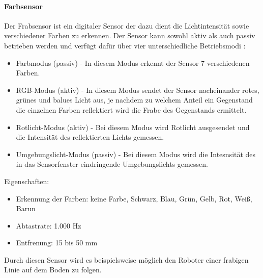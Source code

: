 \paragraph{Farbsensor}
\color{finishing}
Der Frabsensor ist ein digitaler Sensor der dazu dient die Lichtintensität sowie verschiedener Farben zu erkennen. Der Sensor kann sowohl
aktiv als auch passiv betrieben werden und verfügt dafür über vier unterschiedliche Betriebsmodi  \cite[vgl.][101]{Schobel.RobertaEV3Programmieren}:
\begin{itemize}
	\item{Farbmodus (passiv)} - In diesem Modus erkennt der Sensor 7 verschiedenen Farben.
	\item{RGB-Modus (aktiv)} - In diesem Modus sendet der Sensor nacheinander rotes, grünes und balues Licht aus, je nachdem zu welchem Anteil ein Gegenstand die einzelnen Farben reflektiert wird die Frabe des Gegenstands ermittelt.
	\item{Rotlicht-Modus (aktiv)} - Bei diesem Modus wird Rotlicht ausgesendet und die Intensität des reflektierten Lichts gemessen.
	\item{Umgebungslicht-Modus (passiv)} - Bei diesem Modus wird die Intesnsität des in das Sensorfenster eindringende Umgebungslichts gemessen.
\end{itemize}
\smallskip
Eigenschaften:
\begin{itemize}
	\item{Erkennung der Farben:} keine Farbe, Schwarz, Blau, Grün, Gelb, Rot, Weiß, Barun
	\item{Abtastrate:} 1.000 Hz
	\item{Entfrenung:} 15 bis 50 mm
\end{itemize}
Durch diesen Sensor wird es beispielsweise möglich den Roboter einer frabigen Linie auf dem Boden zu folgen.
